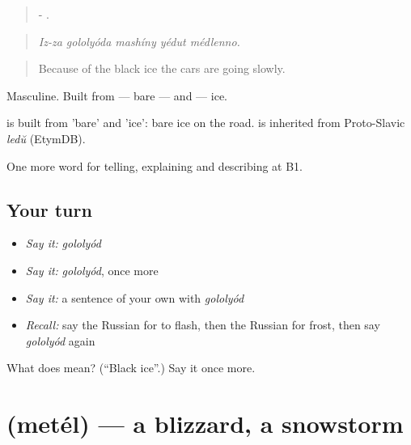 \begin{quote}
-    .
\end{quote}

\begin{quote}
\emph{Iz-za gololyóda mashíny yédut médlenno.}
\end{quote}

\begin{quote}
Because of the black ice the cars are going slowly.
\end{quote}

Masculine. Built from \emph{} — bare — and \emph{} — ice.

\begin{cousinweb}
\emph{} is built from \emph{} 'bare' and \emph{} 'ice': bare ice on the road. \emph{} is inherited from Proto-Slavic \emph{ledŭ} (EtymDB).
\end{cousinweb}

\begin{grammarlens}[title={What you've built}]
One more word for telling, explaining and describing at B1.
\end{grammarlens}

\subsection*{Your turn}
\begin{itemize}
\raggedright
  \item \emph{Say it:} \emph{gololyód}
  \item \emph{Say it:} \emph{gololyód}, once more
  \item \emph{Say it:} a sentence of your own with \emph{gololyód}
  \item \emph{Recall:} say the Russian for to flash, then the Russian for frost, then say \emph{gololyód} again
\end{itemize}

\begin{tcolorbox}[breakable,colback=teal!4,colframe=teal!35!black,title={Before you move on}]
What does  mean? (\textquotedblleft{}Black ice\textquotedblright{}.) Say it once more.
\end{tcolorbox}
\section[\texorpdfstring{\ru{метель} (metél)}{метель (metél)}]{ (metél) — a blizzard, a snowstorm}

